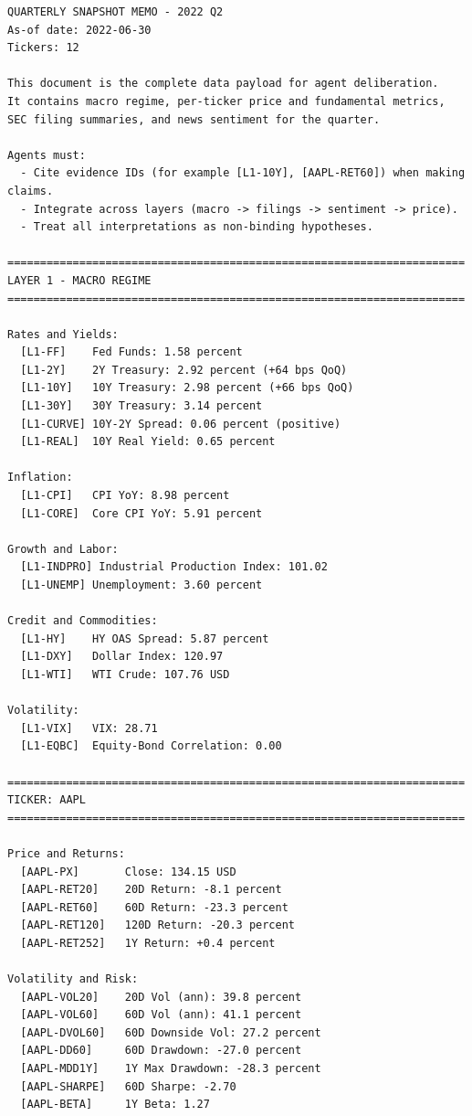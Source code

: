 \documentclass{article}
\begin{document}
\begin{lstlisting}[backgroundcolor=\color{promptbg}]
QUARTERLY SNAPSHOT MEMO - 2022 Q2
As-of date: 2022-06-30
Tickers: 12

This document is the complete data payload for agent deliberation.
It contains macro regime, per-ticker price and fundamental metrics,
SEC filing summaries, and news sentiment for the quarter.

Agents must:
  - Cite evidence IDs (for example [L1-10Y], [AAPL-RET60]) when making claims.
  - Integrate across layers (macro -> filings -> sentiment -> price).
  - Treat all interpretations as non-binding hypotheses.

======================================================================
LAYER 1 - MACRO REGIME
======================================================================

Rates and Yields:
  [L1-FF]    Fed Funds: 1.58 percent
  [L1-2Y]    2Y Treasury: 2.92 percent (+64 bps QoQ)
  [L1-10Y]   10Y Treasury: 2.98 percent (+66 bps QoQ)
  [L1-30Y]   30Y Treasury: 3.14 percent
  [L1-CURVE] 10Y-2Y Spread: 0.06 percent (positive)
  [L1-REAL]  10Y Real Yield: 0.65 percent

Inflation:
  [L1-CPI]   CPI YoY: 8.98 percent
  [L1-CORE]  Core CPI YoY: 5.91 percent

Growth and Labor:
  [L1-INDPRO] Industrial Production Index: 101.02
  [L1-UNEMP] Unemployment: 3.60 percent

Credit and Commodities:
  [L1-HY]    HY OAS Spread: 5.87 percent
  [L1-DXY]   Dollar Index: 120.97
  [L1-WTI]   WTI Crude: 107.76 USD

Volatility:
  [L1-VIX]   VIX: 28.71
  [L1-EQBC]  Equity-Bond Correlation: 0.00

======================================================================
TICKER: AAPL
======================================================================

Price and Returns:
  [AAPL-PX]       Close: 134.15 USD
  [AAPL-RET20]    20D Return: -8.1 percent
  [AAPL-RET60]    60D Return: -23.3 percent
  [AAPL-RET120]   120D Return: -20.3 percent
  [AAPL-RET252]   1Y Return: +0.4 percent

Volatility and Risk:
  [AAPL-VOL20]    20D Vol (ann): 39.8 percent
  [AAPL-VOL60]    60D Vol (ann): 41.1 percent
  [AAPL-DVOL60]   60D Downside Vol: 27.2 percent
  [AAPL-DD60]     60D Drawdown: -27.0 percent
  [AAPL-MDD1Y]    1Y Max Drawdown: -28.3 percent
  [AAPL-SHARPE]   60D Sharpe: -2.70
  [AAPL-BETA]     1Y Beta: 1.27


\end{lstlisting}
\end{document}
